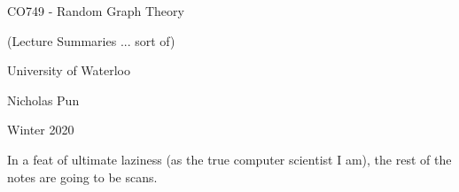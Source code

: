\documentclass[12pt]{article}
\newcommand{\includelecture}[1]{
  
  
  \clearpage
}
\begin{document}
\begin{titlepage}
  \centering
  \vspace*{2in}
  {\huge CO749 - Random Graph Theory}\par
  {\Large (Lecture Summaries ... sort of)}\par
  \vspace{0.3in}
  {\large University of Waterloo}\par
  {\large Nicholas Pun}\par
  {\large Winter 2020}\par 
\end{titlepage}
 
\tableofcontents
\clearpage

\clearpage
\clearpage
\clearpage
\clearpage
\clearpage

In a feat of ultimate laziness (as the true computer scientist I am), the rest of the notes are going to be scans.

\includelecture{sections/lec6.pdf}
\includelecture{sections/lec7.pdf}
\includelecture{sections/lec8.pdf}
\includelecture{sections/lec9.pdf}
\includelecture{sections/lec10.pdf}
\includelecture{sections/lec11.pdf}
\includelecture{sections/lec12.pdf}
\includelecture{sections/lec13.pdf}
\includelecture{sections/lec14.pdf}
\includelecture{sections/lec15.pdf}
\includelecture{sections/lec16.pdf}

\nocite{*}


\end{document}

